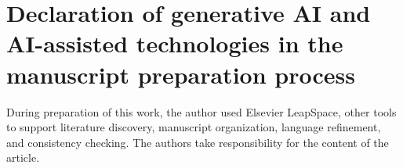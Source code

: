\documentclass[preprint,12pt,authoryear]{elsarticle}
\begin{document}
\section*{Declaration of generative AI and AI-assisted technologies in the manuscript preparation process}
During preparation of this work, the author used Elsevier LeapSpace, other tools to support literature discovery, manuscript organization, language refinement, and consistency checking. The authors take responsibility for the content of the article.


\begingroup\raggedright
\setlength{\bibsep}{0pt}

\endgroup
\end{document}
